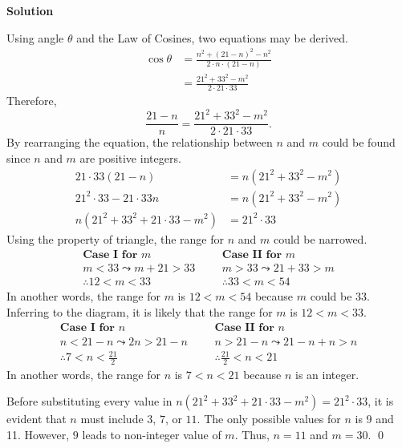 \documentclass{article}
\newenvironment{solution}{\begin{trivlist}\item[]
{\bf Solution}}{\qed \end{trivlist}}
\begin{document}
\begin{solution}
\begin{center}
\end{center}
Using angle $\theta$ and the Law of Cosines, two
equations may be derived.
\begin{align*}
    \cos\theta
    &= \frac{ n^2 + (21 - n)^2 - n^2 }
        { 2 \cdot n \cdot (21 - n) } \\
    &= \frac{ 21^2 + 33^2- m^2 }{ 2 \cdot 21 \cdot 33 }
\end{align*}
Therefore,
\[
\frac{21 - n}{n} =
\frac{21^2 + 33^2 - m^2}{2 \cdot 21 \cdot 33}.
\]
By rearranging the equation, the relationship between
$n$ and $m$ could be found since $n$ and $m$ are
positive integers.
\begin{align*}
    21 \cdot 33 (21 - n) &= n (21^2 + 33^2 - m^2) \\
    21^2 \cdot 33 - 21 \cdot 33n &=
        n (21^2 + 33^2 - m^2) \\
    n (21^2 + 33^2 + 21 \cdot 33 - m^2) &= 21^2 \cdot 33
\end{align*}
Using the property of triangle, the range for
$n$ and $m$ could be narrowed.
\[
\begin{array}{cccc}
   \textbf{Case I for $m$} & & & \textbf{Case II for $m$} \\
    m < 33 \leadsto m + 21 > 33 & & & m
    > 33 \leadsto 21 + 33 > m \\
    \therefore 12 < m < 33 & & & \therefore 33 < m < 54
\end{array}
\]
In another words, the range for $m$ is $12 < m < 54$
because $m$ could be 33. Inferring to the diagram,
it is likely that the range for $m$ is $12 < m < 33$.
\[
\begin{array}{cccc}
   \textbf{Case I for $n$} & & & \textbf{Case II for $n$} \\
    n < 21 - n \leadsto 2n > 21 - n & & &
    n > 21 - n \leadsto 21 - n + n > n \\
    \therefore 7 < n < \frac{21}{2} & & &
    \therefore \frac{21}{2} < n < 21
\end{array}
\]
In another words, the range for $n$ is $7 < n < 21$
because $n$ is an integer.

Before substituting every value in
$n (21^2 + 33^2 + 21 \cdot 33 - m^2) = 21^2 \cdot 33$,
it is evident that $n$ must include $3$, $7$, or $11$.
The only possible values for $n$ is 9 and 11. However,
$9$ leads to non-integer value of $m$. Thus, $n=11$ and
$\boxed{m=30}$.
\end{solution}
\end{document}
